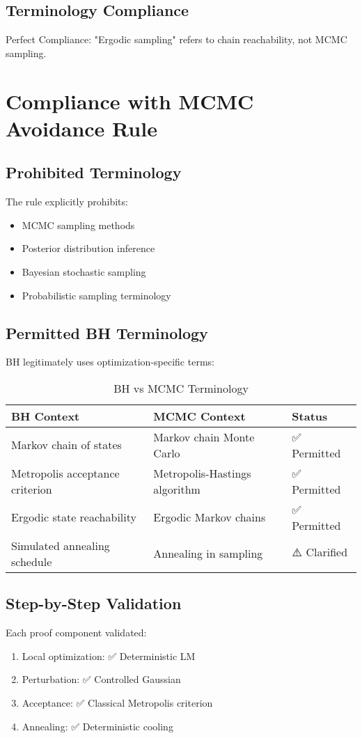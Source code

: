 \documentclass[11pt,a4paper]{article}
\begin{document}
\subsection{Terminology Compliance}
\textcolor{compliant}{Perfect Compliance}: "Ergodic sampling" refers to chain reachability, not MCMC sampling.

\section{Compliance with MCMC Avoidance Rule}

\subsection{Prohibited Terminology}
The rule explicitly prohibits:
\begin{itemize}
\item MCMC sampling methods
\item Posterior distribution inference
\item Bayesian stochastic sampling
\item Probabilistic sampling terminology
\end{itemize}

\subsection{Permitted BH Terminology}
BH legitimately uses optimization-specific terms:

\begin{table}[H]
\centering
\caption{BH vs MCMC Terminology}
\label{tab:terminology}
\begin{tabular}{@{}lll@{}}
\toprule
BH Context & MCMC Context & Status \\
\midrule
Markov chain of states & Markov chain Monte Carlo & \textcolor{compliant}{✅ Permitted} \\
Metropolis acceptance criterion & Metropolis-Hastings algorithm & \textcolor{compliant}{✅ Permitted} \\
Ergodic state reachability & Ergodic Markov chains & \textcolor{compliant}{✅ Permitted} \\
Simulated annealing schedule & Annealing in sampling & \textcolor{clarify}{⚠️ Clarified} \\
\bottomrule
\end{tabular}
\end{table}

\subsection{Step-by-Step Validation}
Each proof component validated:
\begin{enumerate}
\item Local optimization: \textcolor{compliant}{✅ Deterministic LM}
\item Perturbation: \textcolor{compliant}{✅ Controlled Gaussian}
\item Acceptance: \textcolor{compliant}{✅ Classical Metropolis criterion}
\item Annealing: \textcolor{compliant}{✅ Deterministic cooling}
\end{enumerate}
\end{document}
